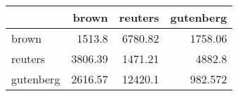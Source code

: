 \begin{tabular}{lrrr}
\hline
           &   brown &   reuters &   gutenberg \\
\hline
 brown     & 1513.8  &   6780.82 &    1758.06  \\
 reuters   & 3806.39 &   1471.21 &    4882.8   \\
 gutenberg & 2616.57 &  12420.1  &     982.572 \\
\hline
\end{tabular}